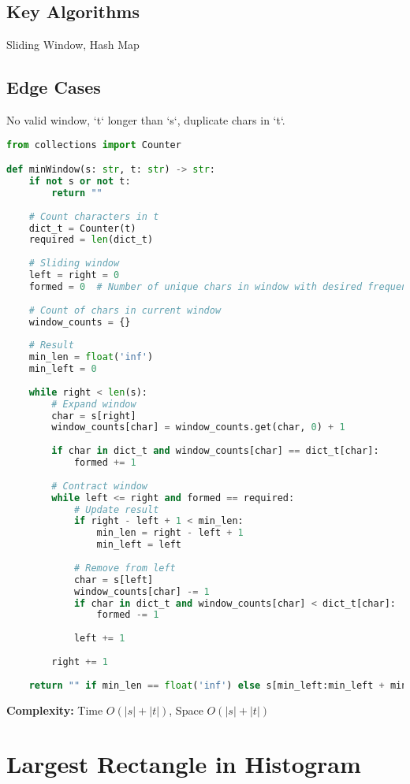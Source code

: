 \documentclass[10pt, a4paper]{article}
\begin{document}
\subsection*{Key Algorithms}
Sliding Window, Hash Map

\subsection*{Edge Cases}
No valid window, `t` longer than `s`, duplicate chars in `t`.

\begin{lstlisting}[language=Python]
from collections import Counter

def minWindow(s: str, t: str) -> str:
    if not s or not t:
        return ""
    
    # Count characters in t
    dict_t = Counter(t)
    required = len(dict_t)
    
    # Sliding window
    left = right = 0
    formed = 0  # Number of unique chars in window with desired frequency
    
    # Count of chars in current window
    window_counts = {}
    
    # Result
    min_len = float('inf')
    min_left = 0
    
    while right < len(s):
        # Expand window
        char = s[right]
        window_counts[char] = window_counts.get(char, 0) + 1
        
        if char in dict_t and window_counts[char] == dict_t[char]:
            formed += 1
        
        # Contract window
        while left <= right and formed == required:
            # Update result
            if right - left + 1 < min_len:
                min_len = right - left + 1
                min_left = left
            
            # Remove from left
            char = s[left]
            window_counts[char] -= 1
            if char in dict_t and window_counts[char] < dict_t[char]:
                formed -= 1
            
            left += 1
        
        right += 1
    
    return "" if min_len == float('inf') else s[min_left:min_left + min_len]
\end{lstlisting}
\textbf{Complexity:} Time $O(|s| + |t|)$, Space $O(|s| + |t|)$

\section{Largest Rectangle in Histogram}
\end{document}
